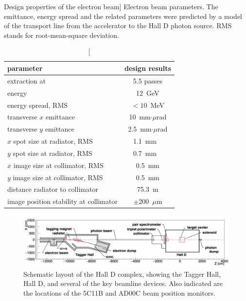 \begin{table}[tbp]
\begin{center}
\caption
[Design properties of the electron beam]
{Electron beam parameters. The emittance, energy spread and
the related parameters were
predicted by a model of the transport line from
the accelerator to the Hall D photon source. RMS stands for root-mean-square deviation.}
\label{tab:elecprop}
\begin{tabular}{|l|c|}
\hline\hline
parameter & design results \\
\hline
extraction at & 5.5 passes \\
energy & 12~GeV \\
energy spread, RMS & $<10$~MeV \\
transverse $x$ emittance & 10~mm$\cdot\mu$rad \\
transverse $y$ emittance & 2.5~mm$\cdot\mu$rad \\
$x$ spot size at radiator, RMS & 1.1~mm \ \\
$y$ spot size at radiator, RMS & 0.7~mm \ \\
$x$ image size at collimator, RMS & 0.5~mm \\
$y$ image size at collimator, RMS & 0.5~mm \\
distance radiator to collimator & 75.3~m \\
image position stability at collimator & $\pm$200~$\mu$m \\
\hline\hline
\end{tabular}
\end{center}
\end{table}



\begin{figure}[t]
\begin{center}
 \includegraphics[clip=true,width=0.98\linewidth]{figures/Draw_beamline.png}
\end{center}
\caption{Schematic layout of the Hall D complex, showing the Tagger Hall, Hall D, and several of the key beamline devices. Also indicated are the locations of the 5C11B and AD00C beam position monitors.
        }
\label{fig:beam:Draw_beamline} 
\end{figure}

